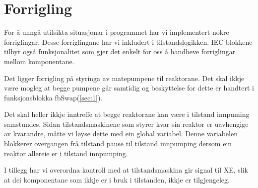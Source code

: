 \section{Forrigling}
\thispagestyle{fancy}

For å unngå utilsikta situasjonar i programmet har vi implementert nokre forriglingar.
Desse forriglingane har vi inkludert i tilstandslogikken.\newline
\gls{IEC} blokkene tilbyr også funksjonalitet som gjer det enkelt for oss å handheve forriglingar mellom komponentane.

Det ligger forrigling på styringa av matepumpene til reaktorane. Det skal ikkje være mogleg at begge pumpene går samtidig
og beskyttelse for dette er handtert i funksjonsblokka fbSwap(\ref{sec:1}).

Det skal heller ikkje inntreffe at begge reaktorane kan være i tilstand innpuming samstundes.
Sidan tilstandsmaskinene som styrer kvar sin reaktor er uavhengige av kvarandre, måtte vi løyse dette med ein
global variabel. Denne variabelen blokkerer overgangen frå tilstand pause til tilstand innpumping dersom ein reaktor allereie er i tilstand innpumping.

I tillegg har vi overordna kontroll med at tilstandsmaskina gir signal til \gls{XE}, 
slik at dei komponentane som ikkje er i bruk i tilstanden, ikkje er tilgjengeleg.

\newpage








